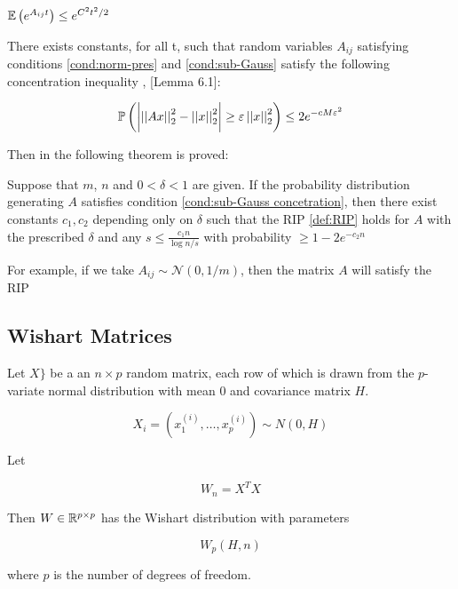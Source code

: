 \documentclass{article}
\begin{document}
\begin{condition}
\({\mathbb{E}}\left( e^{A_{ij}t} \right) \leq e^{C^2 t^2 /2}\)
\label{cond:sub-Gauss}
\end{condition}

\begin{lemma}[Concentration]
There exists constants, for all t, such that random variables \(A_{ij}\) satisfying conditions \eqref{cond:norm-pres} and \eqref{cond:sub-Gauss} satisfy the following concentration inequality \cite{baraniuk2008simple}, \cite{Devore09instanceoptimalityin}[Lemma 6.1]:

\begin{equation}
{\mathbb{P}}\left( \biggl\lvert \left|\left|Ax\right|\right|_2^2 - \left|\left|x\right|\right|_2^2 \biggr\rvert \geq \varepsilon  \left|\left|x\right|\right|_2^2 \right) \leq 2e^{-cM\varepsilon^2}
\label{cond:sub-Gauss concetration}
\end{equation} 
\end{lemma}

Then in \cite{baraniuk2008simple} the following theorem is proved:

\begin{theorem}
Suppose that \(m\), \(n\) and \(0 < \delta < 1\) are given. If the probability distribution generating \(A\) satisfies condition \eqref{cond:sub-Gauss concetration}, then there exist constants \(c_1, c_2\) depending only on \(\delta\) such that the RIP \eqref{def:RIP} holds for \(A\) with the prescribed \(\delta\) and any  \(s \leq \frac{c_1 n}{\log{n/s}}\) with probability \(\geq 1-2e^{-c_2n}\) 
\end{theorem}

For example, if we take \(A_{ij} \sim \mathcal{N}\left(0, 1/m\right)\), then the matrix \(A\) will satisfy the RIP 

\subsection{Wishart Matrices}

Let \(X\}\) be a an \(n \times p\) random matrix, each row of which is drawn from the \(p\)-variate normal distribution with mean 0 and covariance matrix \(H\).

\begin{equation}
X_i = \left(x_1^{(i)}, \ldots , x_p^{(i)}\right) \sim N\left(0, H\right)
\end{equation}


\begin{definition}
Let 

\begin{equation}
W_n = X^T X
\end{equation}

Then \(W \in {\mathbb{R}}^{p \times p}\) has the Wishart distribution with parameters 

\begin{equation}
W_p\left(H, n\right)
\end{equation}

where \(p\) is the number of degrees of freedom.
\end{definition}
\end{document}
